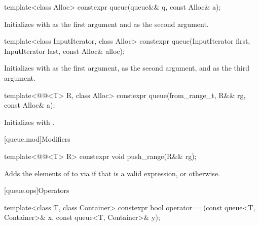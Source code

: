 %
\begin{itemdecl}
template<class Alloc> constexpr queue(queue&& q, const Alloc& a);
\end{itemdecl}

\begin{itemdescr}
\pnum
\effects
Initializes  with  as the first argument and 
as the second argument.
\end{itemdescr}

%
\begin{itemdecl}
template<class InputIterator, class Alloc>
  constexpr queue(InputIterator first, InputIterator last, const Alloc& alloc);
\end{itemdecl}

\begin{itemdescr}
\pnum
\effects
Initializes  with
 as the first argument,
 as the second argument, and
 as the third argument.
\end{itemdescr}

%
\begin{itemdecl}
template<@@<T> R, class Alloc>
  constexpr queue(from_range_t, R&& rg, const Alloc& a);
\end{itemdecl}

\begin{itemdescr}
\pnum
\effects
Initializes  with
.
\end{itemdescr}

[queue.mod]{Modifiers}

%
\begin{itemdecl}
template<@@<T> R>
  constexpr void push_range(R&& rg);
\end{itemdecl}

\begin{itemdescr}
\pnum
\effects
Adds the elements of  to 
via  if that is a valid expression,
or  otherwise.
\end{itemdescr}

[queue.ops]{Operators}

%
\begin{itemdecl}
template<class T, class Container>
  constexpr bool operator==(const queue<T, Container>& x, const queue<T, Container>& y);
\end{itemdecl}

